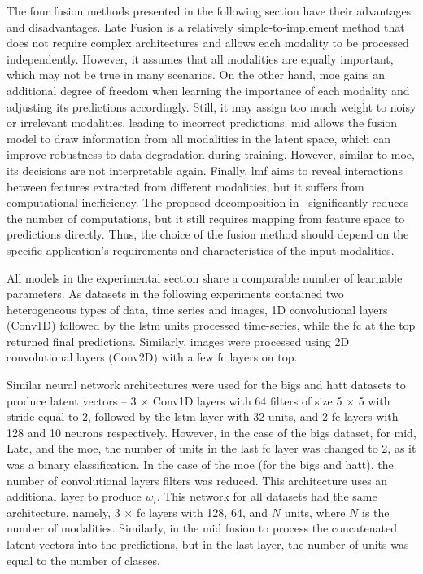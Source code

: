 \documentclass[a4paper, 10pt, twoside]{report}
\begin{document}
The four fusion methods presented in the following section have their advantages and disadvantages. Late Fusion is a relatively simple-to-implement method that does not require complex architectures and allows each modality to be processed independently. However, it assumes that all modalities are equally important, which may not be true in many scenarios. On the other hand, \acrshort{moe} gains an additional degree of freedom when learning the importance of each modality and adjusting its predictions accordingly. Still, it may assign too much weight to noisy or irrelevant modalities, leading to incorrect predictions. \acrshort{mid} allows the fusion model to draw information from all modalities in the latent space, which can improve robustness to data degradation during training. However, similar to \acrshort{moe}, its decisions are not interpretable again. Finally, \acrshort{lmf} aims to reveal interactions between features extracted from different modalities, but it suffers from computational inefficiency. The proposed decomposition in~\cite{mid_ELMF} significantly reduces the number of computations, but it still requires mapping from feature space to predictions directly. Thus, the choice of the fusion method should depend on the specific application's requirements and characteristics of the input modalities.

All models in the experimental section share a comparable number of learnable parameters. As datasets in the following experiments contained two heterogeneous types of data, \ie time series and images, 1D convolutional layers (Conv1D) followed by the \acrshort{lstm} units processed time-series, while the \acrshort{fc} at the top returned final predictions. Similarly, images were processed using 2D convolutional layers (Conv2D) with a few \acrshort{fc} layers on top.

Similar neural network architectures were used for the \acrshort{bigs} and \acrshort{hatt} datasets to produce latent vectors -- 3 $\times$ Conv1D layers with 64 filters of size 5 $\times$ 5 with stride equal to 2, followed by the \acrshort{lstm} layer with 32 units, and 2 \acrshort{fc} layers with 128 and 10 neurons respectively. However, in the case of the \acrshort{bigs} dataset, for \acrshort{mid}, Late, and the \acrshort{moe}, the number of units in the last \acrshort{fc} layer was changed to 2, as it was a binary classification. In the case of the \acrshort{moe} (for the \acrshort{bigs} and \acrshort{hatt}), the number of convolutional layers filters was reduced. This architecture uses an additional layer to produce $w_i$. This network for all datasets had the same architecture, namely, 3 $\times$ \acrshort{fc} layers with 128, 64, and $N$ units, where $N$ is the number of modalities. Similarly, in the \acrshort{mid} fusion to process the concatenated latent vectors into the predictions, but in the last layer, the number of units was equal to the number of classes.
\end{document}
